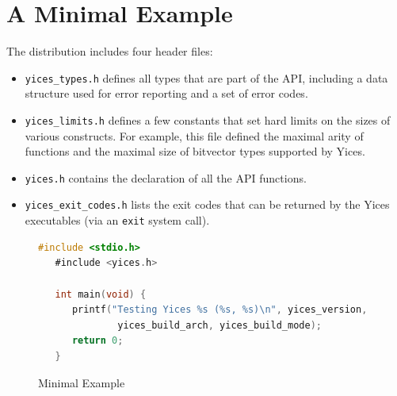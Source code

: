 \documentclass[11pt,twoside,fleqn,openright,titlepage]{cslreport}
\begin{document}
\section{A Minimal Example}

The distribution includes four header files:
\begin{itemize}
\item \texttt{yices\_types.h} defines all types that are part of the API,
including a data structure used for error reporting and a set of error codes.
\item \texttt{yices\_limits.h} defines a few constants that set hard
  limits on the sizes of various constructs. For example, this file
  defined the maximal arity of functions and the maximal size of
  bitvector types supported by Yices.
\item \texttt{yices.h} contains the declaration of all the API functions.
\item \texttt{yices\_exit\_codes.h} lists the exit codes that can be
  returned by the Yices executables (via an \texttt{exit} system call).
\end{itemize}

\begin{figure}
\begin{footnotesize}
\begin{lstlisting}[language=C,otherkeywords={\#include},stringstyle=\color{red}]
   #include <stdio.h>
   #include <yices.h>

   int main(void) {
      printf("Testing Yices %s (%s, %s)\n", yices_version,
              yices_build_arch, yices_build_mode);
      return 0;
   }
\end{lstlisting}
\end{footnotesize}
\caption{Minimal Example}
\label{minimal}
\end{figure}
\end{document}
